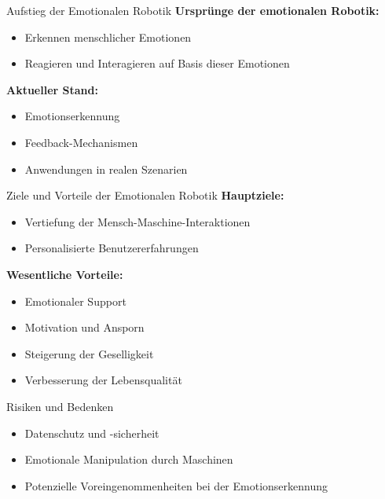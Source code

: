 \documentclass[aspectratio=169]{beamer}
\begin{document}
\begin{frame}{Aufstieg der Emotionalen Robotik}
  \textbf{Ursprünge der emotionalen Robotik:}
  \begin{itemize}
      \item Erkennen menschlicher Emotionen
      \item Reagieren und Interagieren auf Basis dieser Emotionen
  \end{itemize}
  
  \textbf{Aktueller Stand:}
  \begin{itemize}
      \item Emotionserkennung
      \item Feedback-Mechanismen
      \item Anwendungen in realen Szenarien
  \end{itemize}
\end{frame}

\begin{frame}{Ziele und Vorteile der Emotionalen Robotik}
  \textbf{Hauptziele:}
  \begin{itemize}
      \item Vertiefung der Mensch-Maschine-Interaktionen
      \item Personalisierte Benutzererfahrungen
  \end{itemize}
  
  \textbf{Wesentliche Vorteile:}
  \begin{itemize}
      \item Emotionaler Support
      \item Motivation und Ansporn
      \item Steigerung der Geselligkeit
      \item Verbesserung der Lebensqualität
  \end{itemize}
\end{frame}

\begin{frame}{Risiken und Bedenken}
  \begin{itemize}
      \item Datenschutz und -sicherheit
      \item Emotionale Manipulation durch Maschinen
      \item Potenzielle Voreingenommenheiten bei der Emotionserkennung
  \end{itemize}
\end{frame}
\end{document}
